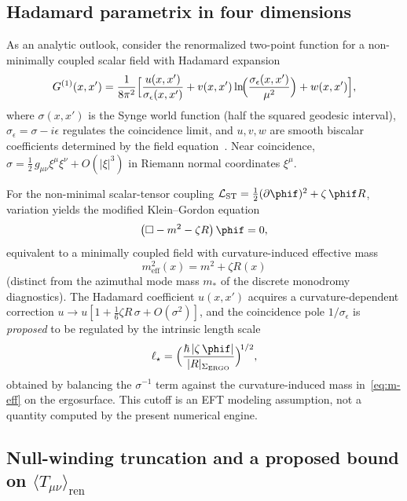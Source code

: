 \subsection{Hadamard parametrix in four dimensions}

As an analytic outlook, consider the renormalized two-point function for a
non-minimally coupled scalar field with Hadamard expansion
\begin{equation}
\label{eq:hadamard}
G^{(1)}(x,x')
= \frac{1}{8\pi^{2}}
\Bigl[
\frac{u(x,x')}{\sigma_{\epsilon}(x,x')}
+ v(x,x')\ln\!\Bigl(\frac{\sigma_{\epsilon}(x,x')}{\mu^{2}}\Bigr)
+ w(x,x')
\Bigr],
\end{equation}
where $\sigma(x,x')$ is the Synge world function (half the squared geodesic
interval), $\sigma_{\epsilon}=\sigma-i\epsilon$ regulates the coincidence
limit, and $u,v,w$ are smooth biscalar coefficients determined by the field
equation~\cite{DeWitt1975,BirrellDavies1982}. Near coincidence,
$\sigma=\tfrac12\,g_{\mu\nu}\xi^{\mu}\xi^{\nu}+O(|\xi|^{3})$ in Riemann
normal coordinates $\xi^{\mu}$.

For the non-minimal scalar-tensor coupling
$\mathcal{L}_{\mathrm{ST}}=\tfrac12(\partial\phif)^{2}+\zeta\,\phif R$,
variation yields the modified Klein--Gordon equation
\begin{equation}
\label{eq:modified-kg}
\bigl(\Box - m^{2} - \zeta R\bigr)\,\phif = 0,
\end{equation}
equivalent to a minimally coupled field with curvature-induced effective mass
\begin{equation}
\label{eq:m-eff}
m_{\mathrm{eff}}^{2}(x)=m^{2}+\zeta R(x)
\end{equation}
(distinct from the azimuthal mode mass $m_{\ast}$ of the discrete monodromy diagnostics).
The Hadamard coefficient $u(x,x')$ acquires a curvature-dependent correction
$u\to u[1+\tfrac16\zeta R\,\sigma+O(\sigma^{2})]$, and the coincidence
pole $1/\sigma_{\epsilon}$ is \emph{proposed} to be regulated by the intrinsic
length scale
\begin{equation}
\label{eq:l-star-full}
\ell_{\star}
=\Bigl(\frac{\hbar\,|\zeta\,\phif|}{|R|_{\Sigma_{\mathrm{ERGO}}}}\Bigr)^{\!1/2},
\end{equation}
obtained by balancing the $\sigma^{-1}$ term against the
curvature-induced mass in~\eqref{eq:m-eff} on the ergosurface.
This cutoff is an EFT modeling assumption, not a quantity computed by the
present numerical engine.

\subsection{\texorpdfstring{Null-winding truncation and a proposed bound on $\langle T_{\mu\nu}\rangle_{\mathrm{ren}}$}{Null-winding truncation and a proposed bound on renormalized stress-energy}}

